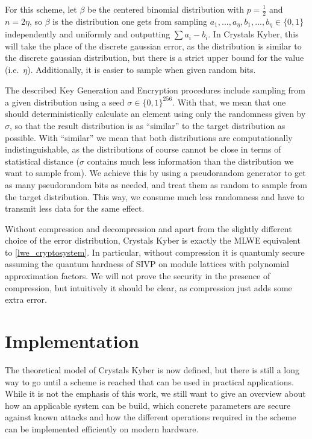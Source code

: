 \documentclass{report}
\begin{document}
For this scheme, let $\beta$ be the centered binomial distribution with $p = \frac 1 2$ and $n = 2\eta$, so $\beta$ is the distribution one gets from sampling $a_1, ..., a_\eta, b_1, ..., b_\eta \in \{ 0, 1 \}$ independently and uniformly and outputting $\sum a_i - b_i$. In Crystals Kyber, this will take the place of the discrete gaussian error, as the distribution is similar to the discrete gaussian distribution, but there is a strict upper bound for the value (i.e.\ $\eta$). Additionally, it is easier to sample when given random bits.

The described Key Generation and Encryption procedures include sampling from a given distribution using a seed $\sigma \in \{ 0, 1 \}^{256}$. With that, we mean that one should deterministically calculate an element using only the randomness given by $\sigma$, so that the result distribution is as ``similar'' to the target distribution as possible. With ``similar'' we mean that both distributions are computationally indistinguishable, as the distributions of course cannot be close in terms of statistical distance ($\sigma$ contains much less information than the distribution we want to sample from). We achieve this by using a pseudorandom generator to get as many pseudorandom bits as needed, and treat them as random to sample from the target distribution. This way, we consume much less randomness and have to transmit less data for the same effect.

Without compression and decompression and apart from the slightly different choice of the error distribution, Crystals Kyber is exactly the MLWE equivalent to \ref{lwe_cryptosystem}. In particular, without compression it is quantumly secure assuming the quantum hardness of SIVP on module lattices with polynomial approximation factors. We will not prove the security in the presence of compression, but intuitively it should be clear, as compression just adds some extra error.


\chapter{Implementation}

\motivation
The theoretical model of Crystals Kyber is now defined, but there is still a long way to go until a scheme is reached that can be used in practical applications. While it is not the emphasis of this work, we still want to give an overview about how an applicable system can be build, which concrete parameters are secure against known attacks and how the different operations required in the scheme can be implemented efficiently on modern hardware. 
\end{document}
